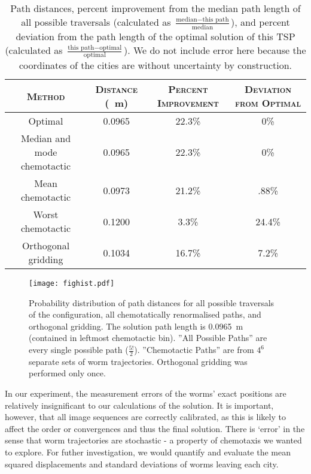 \documentclass[10pt]{article}
\begin{document}
\begin{table}[H]
	\centering
	\begin{tabular}{c | c c c}
	\hline
	\textsc{Method} & \textsc{Distance} (\SI{}{\meter}) & \textsc{Percent Improvement} & \textsc{Deviation from Optimal} \\
	\hline
	Optimal 					& 0.0965 & 22.3\% & 0\% 	\\
    Median and mode chemotactic & 0.0965 & 22.3\% & 0\% 	\\
	Mean chemotactic 			& 0.0973 & 21.2\% & .88\% 	\\
    Worst chemotactic 			& 0.1200 & 3.3\%  & 24.4\% 	\\
	Orthogonal gridding 		& 0.1034 & 16.7\% & 7.2\% 	\\
	\hline
	\end{tabular}
	\caption{Path distances, percent improvement from the median path length of all possible traversals (calculated as $ \frac{\text{median} - \text{this path}}{\text{median}} $), and percent deviation from the path length of the optimal solution of this TSP (calculated as $ \frac{\text{this path} - \text{optimal}}{\text{optimal}} $). We do not include error here because the coordinates of the cities are without uncertainty by construction.}
	\label{tab}
\end{table}


\begin{figure}[H]
	\centering
    \texttt{[image: fighist.pdf]}
    \caption{Probability distribution of path distances for all possible traversals of the configuration, all chemotatically renormalised paths, and orthogonal gridding. The solution path length is \SI{0.0965}{\metre} (contained in leftmost chemotactic bin). ''All Possible Paths'' are every single possible path ($\frac{5!}{2}$). ''Chemotactic Paths'' are from $4^6$ separate sets of worm trajectories. Orthogonal gridding was performed only once.}
    \label{fighist}
\end{figure}

In our experiment, the measurement errors of the worms' exact positions are relatively insignificant to our calculations of the solution. It is important, however, that all image sequences are correctly calibrated, as this is likely to affect the order or convergences and thus the final solution. There is `error' in the sense that worm trajectories are stochastic - a property of chemotaxis we wanted to explore. For futher investigation, we would quantify and evaluate the mean squared displacements and standard deviations of worms leaving each city.
\end{document}
